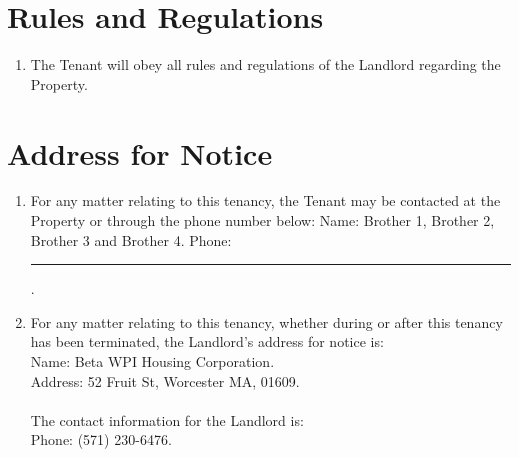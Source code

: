 \documentclass[12pt]{article}
\begin{document}
\section*{Rules and Regulations}
\begin{enumerate}[resume]
    \item The Tenant will obey all rules and regulations of the Landlord
	    regarding the Property.
\end{enumerate}
    
\section*{Address for Notice}
\begin{enumerate}[resume]
    \item For any matter relating to this tenancy, the Tenant may be contacted
	    at the Property or through the phone number below:
	Name: Brother 1, Brother 2, Brother 3 and Brother 4.
	Phone: \rule{3cm}{0.15mm}.
    \item For any matter relating to this tenancy, whether during or after this tenancy has been terminated, the Landlord's address for notice is:\\
        Name: Beta WPI Housing Corporation.\\
        Address: 52 Fruit St, Worcester MA, 01609.\\\\
        The contact information for the Landlord is:\\
        Phone:  (571) 230-6476.
\end{enumerate}
        
\end{document}
